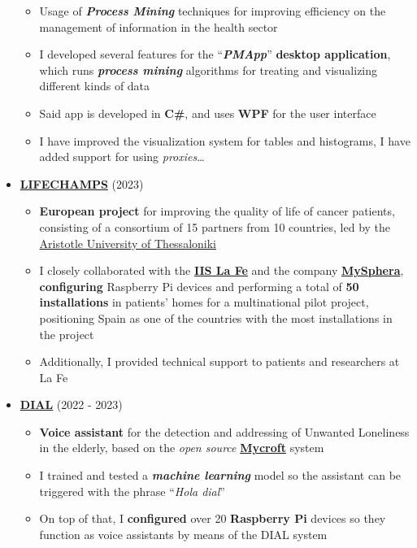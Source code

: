 \documentclass[letterpaper, 12pt, dvipsnames]{article}
\begin{document}
\begin{itemize}
\begin{itemize}
              \item Usage of \textbf{\emph{Process Mining}} techniques for improving efficiency on the management of information in the health sector
              \item I developed several features for the ``\textbf{\emph{PMApp}}'' \textbf{desktop application}, which runs \textbf{\emph{process mining}} algorithms for treating and visualizing different kinds of data
              \item Said app is developed in \textbf{C\#}, and uses \textbf{WPF} for the user interface
              \item I have improved the visualization system for tables and histograms, I have added support for using \emph{proxies}\dots
          \end{itemize}
    \item {\large\textbf{\href{https://lifechamps.eu/}{LIFECHAMPS}}} (2023)
          \begin{itemize}
            \item \textbf{European project} for improving the quality of life of cancer patients, consisting of a consortium of 15 partners from 10 countries, led by the \href{https://www.auth.gr/en/}{Aristotle University of Thessaloniki}
            \item I closely collaborated with the \textbf{\href{https://www.iislafe.es/es/}{IIS La Fe}} and the company \textbf{\href{https://www.mysphera.com/es/}{MySphera}}, \textbf{configuring} Raspberry Pi devices and performing a total of \textbf{50 installations} in patients' homes for a multinational pilot project, positioning Spain as one of the countries with the most installations in the project
            \item Additionally, I provided technical support to patients and researchers at La Fe
          \end{itemize}
    \item {\large\textbf{\href{http://www.sabien.upv.es/project/dial/}{DIAL}}} (2022 - 2023)
          \begin{itemize}
              \item \textbf{Voice assistant} for the detection and addressing of Unwanted Loneliness in the elderly, based on the \emph{open source} \textbf{\href{https://mycroft.ai/}{Mycroft}} system
              \item I trained and tested a \textbf{\emph{machine learning}} model so the assistant can be triggered with the phrase ``\emph{Hola dial}''
              \item On top of that, I \textbf{configured} over 20 \textbf{Raspberry Pi} devices so they function as voice assistants by means of the DIAL system

\end{itemize}
\end{itemize}
\end{document}

